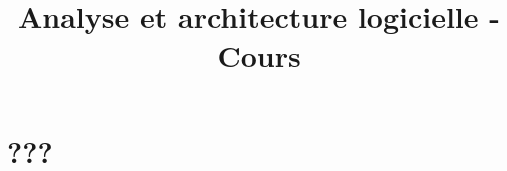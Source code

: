 \documentclass[11pt,a4paper]{article}
\title{Analyse et architecture logicielle - Cours}
\begin{document}
	
	\maketitle
	\section{???}
	
	
	
\end{document}
